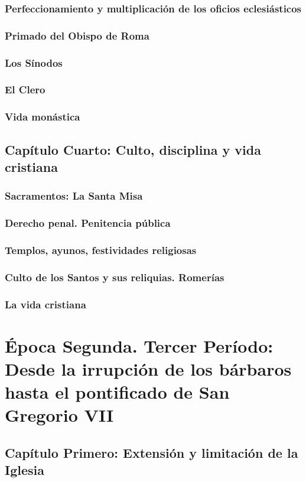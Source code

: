 \raggedbottom{} \documentclass[12pt, a4paper, openany]{book} %
\begin{document}
\section{Perfeccionamiento y multiplicación de los oficios eclesiásticos}
\section{Primado del Obispo de Roma}
\section{Los Sínodos}
\section{El Clero}
\section{Vida monástica}
\chapter{Capítulo Cuarto: Culto, disciplina y vida cristiana}
\section{Sacramentos: La Santa Misa}
\section{Derecho penal. Penitencia pública}
\section{Templos, ayunos, festividades religiosas}
\section{Culto de los Santos y sus reliquias. Romerías}
\section{La vida cristiana}
\part{Época Segunda. Tercer Período: Desde la irrupción de los bárbaros hasta el pontificado de San Gregorio VII}
\chapter{Capítulo Primero: Extensión y limitación de la Iglesia}
\end{document}
